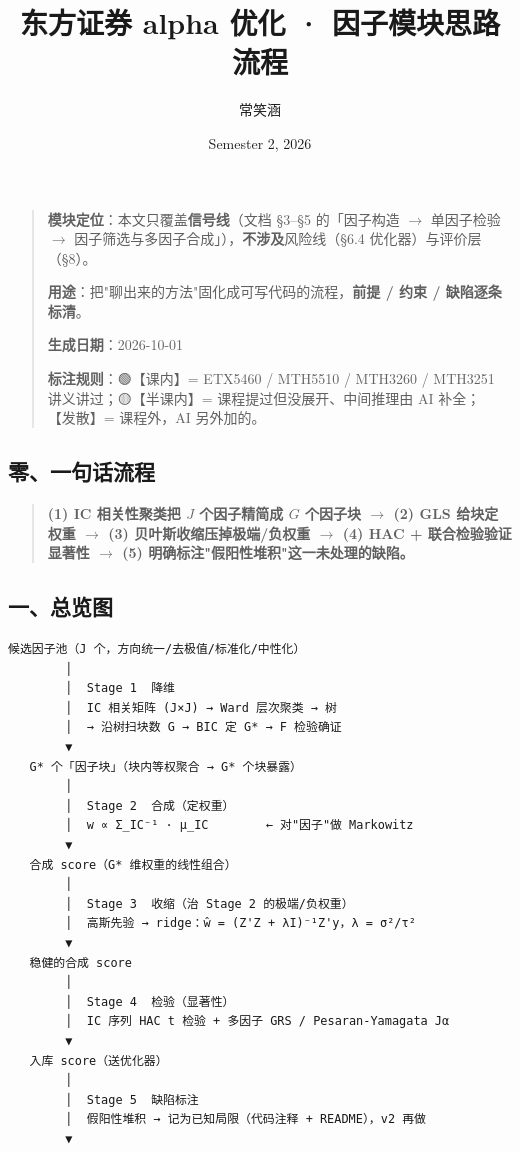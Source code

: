 \documentclass[11pt]{article}
\title{东方证券 alpha 优化 · 因子模块思路流程}
\author{常笑涵}
\date{Semester 2, 2026}
\begin{document}
\maketitle
\tableofcontents
\newpage
\begin{quote}
\textbf{模块定位}：本文只覆盖\textbf{信号线}（文档 \S3--\S5 的「因子构造 \ensuremath{\rightarrow} 单因子检验 \ensuremath{\rightarrow} 因子筛选与多因子合成」），\textbf{不涉及}风险线（\S6.4 优化器）与评价层（\S8）。

\textbf{用途}：把"聊出来的方法"固化成可写代码的流程，\textbf{前提 / 约束 / 缺陷逐条标清}。

\textbf{生成日期}：2026-10-01

\textbf{标注规则}：🟢【课内】= ETX5460 / MTH5510 / MTH3260 / MTH3251 讲义讲过；🟡【半课内】= 课程提过但没展开、中间推理由 AI 补全；🔴【发散】= 课程外，AI 另外加的。
\end{quote}
\subsection{\texorpdfstring{零、一句话流程}{零、一句话流程}}
\begin{quote}
\textbf{(1) IC 相关性聚类把 $J$ 个因子精简成 $G$ 个因子块 \ensuremath{\rightarrow} (2) GLS 给块定权重 \ensuremath{\rightarrow} (3) 贝叶斯收缩压掉极端/负权重 \ensuremath{\rightarrow} (4) HAC + 联合检验验证显著性 \ensuremath{\rightarrow} (5) 明确标注"假阳性堆积"这一未处理的缺陷。}
\end{quote}
\subsection{\texorpdfstring{一、总览图}{一、总览图}}
\begin{verbatim}
候选因子池（J 个，方向统一/去极值/标准化/中性化）
        │
        │  Stage 1  降维
        │  IC 相关矩阵 (J×J) → Ward 层次聚类 → 树
        │  → 沿树扫块数 G → BIC 定 G* → F 检验确证
        ▼
   G* 个「因子块」（块内等权聚合 → G* 个块暴露）
        │
        │  Stage 2  合成（定权重）
        │  w ∝ Σ_IC⁻¹ · μ_IC        ← 对"因子"做 Markowitz
        ▼
   合成 score（G* 维权重的线性组合）
        │
        │  Stage 3  收缩（治 Stage 2 的极端/负权重）
        │  高斯先验 → ridge：ŵ = (Z'Z + λI)⁻¹Z'y，λ = σ²/τ²
        ▼
   稳健的合成 score
        │
        │  Stage 4  检验（显著性）
        │  IC 序列 HAC t 检验 + 多因子 GRS / Pesaran-Yamagata Jα
        ▼
   入库 score（送优化器）
        │
        │  Stage 5  缺陷标注
        │  假阳性堆积 → 记为已知局限（代码注释 + README），v2 再做
        ▼
\end{verbatim}
\end{document}
